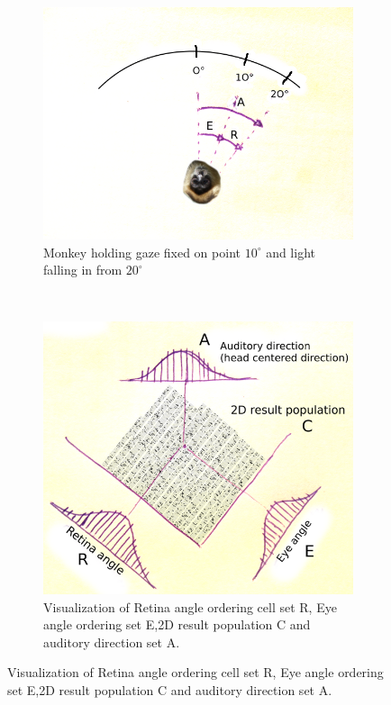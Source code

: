 \documentclass[english,11pt]{article}
\begin{document}
\begin{figure}[H]
        \centering
        \begin{subfigure}[b]{0.5\textwidth}
                \centering
\includegraphics[width=\textwidth]{ape-picture.png}
                \caption{Monkey holding gaze fixed on point $10^\circ$ and light falling in from $20^\circ$}
        \end{subfigure}%
        ~
        \begin{subfigure}[b]{0.5\textwidth}
                \centering
				\includegraphics[width=\textwidth]{Retina-Eye-Auditory.png}
                \caption{Visualization of Retina angle ordering cell set R, Eye angle ordering set E,2D result population C and auditory direction set A.}
        \end{subfigure}
\end{figure}
\end{document}
